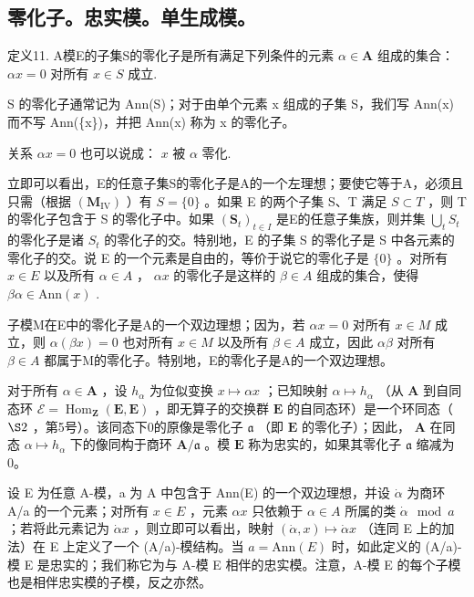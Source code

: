 \subsection{零化子。忠实模。单生成模。}

定义11. A模E的子集S的零化子是所有满足下列条件的元素 \(\alpha \in \mathbf{A}\) 组成的集合：\(\alpha x = 0\) 对所有 \(x \in S\) 成立.

S 的零化子通常记为 Ann(S)；对于由单个元素 x 组成的子集 S，我们写 Ann(x) 而不写 Ann(\{x\})，并把 Ann(x) 称为 x 的零化子。

关系 \(\alpha x = 0\) 也可以说成： \(x\) 被 \(\alpha\) 零化.

立即可以看出，E的任意子集S的零化子是A的一个左理想；要使它等于A，必须且只需（根据 \((\mathbf{M}_{\mathrm{IV}})\) ）有 \(S = \{0\}\) 。如果 E 的两个子集 S、T 满足 \(S \subset T\) ，则 T 的零化子包含于 S 的零化子中。如果 \((\mathbf{S}_{t})_{t \in I}\) 是E的任意子集族，则并集 \(\bigcup_{t} S_{t}\) 的零化子是诸 \(S_{t}\) 的零化子的交。特别地，E 的子集 S 的零化子是 S 中各元素的零化子的交。说 E 的一个元素是自由的，等价于说它的零化子是 \(\{0\}\) 。对所有 \(x \in E\) 以及所有 \(\alpha \in A\) ， \(\alpha x\) 的零化子是这样的 \(\beta \in A\) 组成的集合，使得 \(\beta \alpha \in \text{Ann}(x)\) .

子模M在E中的零化子是A的一个双边理想；因为，若 \(\alpha x = 0\) 对所有 \(x \in M\) 成立，则 \(\alpha(\beta x) = 0\) 也对所有 \(x \in M\) 以及所有 \(\beta \in A\) 成立，因此 \(\alpha\beta\) 对所有 \(\beta \in A\) 都属于M的零化子。特别地，E的零化子是A的一个双边理想。

对于所有 \(\alpha \in \mathbf{A}\) ，设 \(h_{\alpha}\) 为位似变换 \(x \mapsto \alpha x\) ；已知映射 \(\alpha \mapsto h_{\alpha}\) （从 \(\mathbf{A}\) 到自同态环 \(\mathcal{E} = \operatorname{Hom}_{\mathbf{Z}}(\mathbf{E}, \mathbf{E})\) ，即无算子的交换群 \(\mathbf{E}\) 的自同态环）是一个环同态（ \(\S 2\) ，第5号）。该同态下0的原像是零化子 \(\mathfrak{a}\) （即 \(\mathbf{E}\) 的零化子）；因此， \(\mathbf{A}\) 在同态 \(\alpha \mapsto h_{\alpha}\) 下的像同构于商环 \(\mathbf{A}/\mathfrak{a}\) 。模 \(\mathbf{E}\) 称为忠实的，如果其零化子 \(\mathfrak{a}\) 缩减为0。

设 E 为任意 A-模，a 为 A 中包含于 Ann(E) 的一个双边理想，并设 \(\dot{\alpha}\) 为商环 A/a 的一个元素；对所有 \(x \in E\) ，元素 \(\alpha x\) 只依赖于 \(\alpha \in A\) 所属的类 \(\dot{\alpha} \mod a\) ；若将此元素记为 \(\dot{\alpha}x\) ，则立即可以看出，映射 \((\dot{\alpha}, x) \mapsto \dot{\alpha}x\) （连同 E 上的加法）在 E 上定义了一个 (A/a)-模结构。当 \(a = \text{Ann}(E)\) 时，如此定义的 (A/a)-模 E 是忠实的；我们称它为与 A-模 E 相伴的忠实模。注意，A-模 E 的每个子模也是相伴忠实模的子模，反之亦然。

